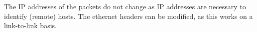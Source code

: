 The IP addresses of the packets do not change as IP addresses are necessary to identify (remote) hosts. The ethernet headers can be modified, as this works on a link-to-link basis.